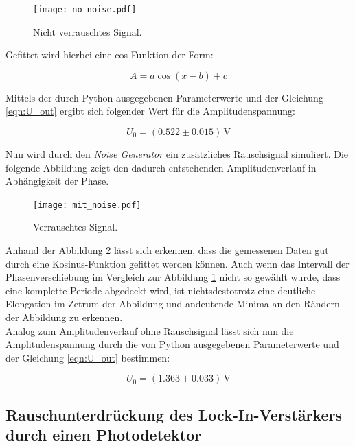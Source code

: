 \begin{figure}[H]
    \texttt{[image: no\_noise.pdf]}
    \caption{Nicht verrauschtes Signal.}
    \label{fig:fit_no_noise}
\end{figure}

\noindent
Gefittet wird hierbei eine cos-Funktion der Form:

\begin{equation*}
    A = a\cos(x - b) + c
\end{equation*}

\noindent Mittels der durch Python ausgegebenen Parameterwerte und der Gleichung \eqref{eqn:U_out} ergibt sich folgender Wert 
für die Amplitudenspannung:

\begin{equation*}
    U_0 = (0.522 \pm 0.015)\,\unit{\volt}
\end{equation*}

\noindent Nun wird durch den \emph{Noise Generator} ein zusätzliches Rauschsignal simuliert. Die folgende Abbildung zeigt den
dadurch entstehenden Amplitudenverlauf in Abhängigkeit der Phase.

\begin{figure}[H]
    \texttt{[image: mit\_noise.pdf]}
    \caption{Verrauschtes Signal.}
    \label{fig:fit_mit_noise}
\end{figure}

\noindent
Anhand der Abbildung \ref{fig:fit_mit_noise} lässt sich erkennen, dass die gemessenen Daten gut durch eine Kosinus-Funktion gefittet werden 
können. Auch wenn das Intervall der Phasenverschiebung im Vergleich zur Abbildung \ref{fig:fit_no_noise} nicht so gewählt 
wurde, dass eine komplette Periode abgedeckt wird, ist nichtsdestotrotz eine deutliche Elongation im Zetrum der Abbildung und 
andeutende Minima an den Rändern der Abbildung zu erkennen.\\
Analog zum Amplitudenverlauf ohne Rauschsignal lässt sich nun die Amplitudenspannung durch die von Python ausgegebenen Parameterwerte
und der Gleichung \eqref{eqn:U_out} bestimmen:

\begin{equation*}
    U_0 = (1.363 \pm 0.033)\,\unit{\volt}
\end{equation*}

\subsection{Rauschunterdrückung des Lock-In-Verstärkers durch einen Photodetektor}

